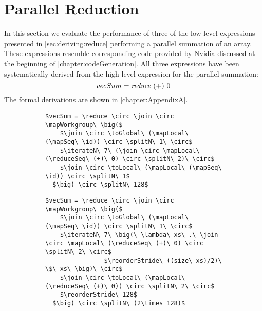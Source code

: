 \section{Parallel Reduction}
In this section we evaluate the performance of three of the low-level expressions presented in \autoref{sec:deriving:reduce} performing a parallel summation of an array.
These expressions resemble corresponding \OpenCL code provided by Nvidia discussed at the beginning of \autoref{chapter:codeGeneration}.
All three expressions have been systematically derived from the high-level expression for the parallel summation:
\begin{equation*}
  vecSum = \text{\textit{reduce}}\ (+)\ 0
\end{equation*}
The formal derivations are shown in \autoref{chapter:AppendixA}.

\begin{figure*}[t]
\captionsetup[subfigure]{justification=justified,singlelinecheck=false}

\begin{subfigure}[b]{\linewidth}
\vspace{.4em}
\begin{minipage}{.05\linewidth}
\caption{}
\label{fig:reduce:expr:1}
\end{minipage}
\hfill
\begin{minipage}{.9\linewidth}
\begin{lstlisting}[mathescape, basicstyle=\small\rmfamily]
$vecSum = \reduce \circ \join \circ \mapWorkgroup\ \big($
    $\join \circ \toGlobal\ (\mapLocal\ (\mapSeq\ \id)) \circ \splitN\ 1\ \circ$
    $\iterateN\ 7\ (\join \circ \mapLocal\ (\reduceSeq\ (+)\ 0) \circ \splitN\ 2)\ \circ$
    $\join \circ \toLocal\ (\mapLocal\ (\mapSeq\ \id)) \circ \splitN\ 1$
  $\big) \circ \splitN\ 128$
\end{lstlisting}
\end{minipage}
\end{subfigure}

\begin{subfigure}[b]{\linewidth}
\vspace{0em}
\begin{minipage}{.05\linewidth}
\caption{}
\label{fig:reduce:expr:2}
\end{minipage}
\hfill
\begin{minipage}{.9\linewidth}
\begin{lstlisting}[mathescape, basicstyle=\small\rmfamily]
$vecSum = \reduce \circ \join \circ \mapWorkgroup\ \big($
    $\join \circ \toGlobal\ (\mapLocal\ (\mapSeq\ \id)) \circ \splitN\ 1\ \circ$
    $\iterateN\ 7\ \big(\ \lambda\ xs\ .\ \join \circ \mapLocal\ (\reduceSeq\ (+)\ 0) \circ \splitN\ 2\ \circ$
                $\reorderStride\ ((size\ xs)/2)\ \$\ xs\ \big)\ \circ$
    $\join \circ \toLocal\ (\mapLocal\ (\reduceSeq\ (+)\ 0)) \circ \splitN\ 2\ \circ$
    $\reorderStride\ 128$
  $\big) \circ \splitN\ (2\times 128)$
\end{lstlisting}
\end{minipage}
\end{subfigure}


\end{figure*}
